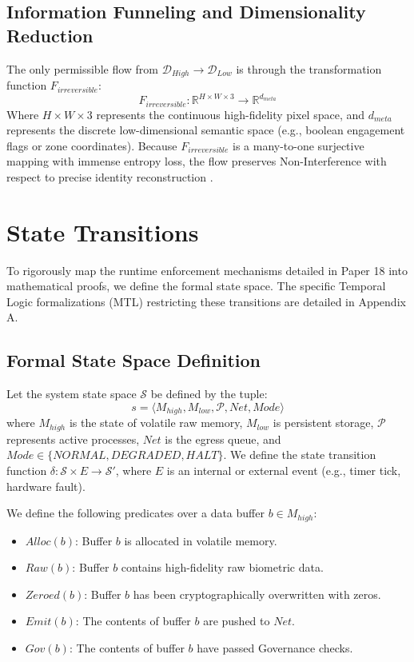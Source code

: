 \documentclass[conference]{IEEEtran}
\begin{document}
\subsection{Information Funneling and Dimensionality Reduction}
The only permissible flow from $\mathcal{D}_{High} \to \mathcal{D}_{Low}$ is through the transformation function $F_{irreversible}$:
\begin{equation}
F_{irreversible}: \mathbb{R}^{H \times W \times 3} \to \mathbb{R}^{d_{meta}}
\end{equation}
Where $H \times W \times 3$ represents the continuous high-fidelity pixel space, and $d_{meta}$ represents the discrete low-dimensional semantic space (e.g., boolean engagement flags or zone coordinates). Because $F_{irreversible}$ is a many-to-one surjective mapping with immense entropy loss, the flow preserves Non-Interference with respect to precise identity reconstruction \cite{b23}.

\section{State Transitions}
To rigorously map the runtime enforcement mechanisms detailed in Paper 18 into mathematical proofs, we define the formal state space. The specific Temporal Logic formalizations (MTL) restricting these transitions are detailed in Appendix A.

\subsection{Formal State Space Definition}
Let the system state space $\mathcal{S}$ be defined by the tuple:
\begin{equation}
s = \langle M_{high}, M_{low}, \mathcal{P}, Net, Mode \rangle
\end{equation}
where $M_{high}$ is the state of volatile raw memory, $M_{low}$ is persistent storage, $\mathcal{P}$ represents active processes, $Net$ is the egress queue, and $Mode \in \{NORMAL, DEGRADED, HALT\}$. 
We define the state transition function $\delta : \mathcal{S} \times E \to \mathcal{S}'$, where $E$ is an internal or external event (e.g., timer tick, hardware fault). 

We define the following predicates over a data buffer $b \in M_{high}$:
\begin{itemize}
    \item $Alloc(b)$: Buffer $b$ is allocated in volatile memory.
    \item $Raw(b)$: Buffer $b$ contains high-fidelity raw biometric data.
    \item $Zeroed(b)$: Buffer $b$ has been cryptographically overwritten with zeros.
    \item $Emit(b)$: The contents of buffer $b$ are pushed to $Net$.
    \item $Gov(b)$: The contents of buffer $b$ have passed Governance checks.
\end{itemize}
\end{document}
